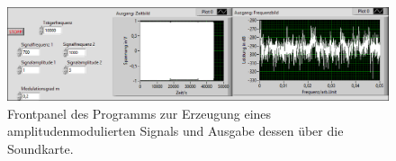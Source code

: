 \documentclass[
a4paper,
12pt,
pagesize,
ngerman
]{scrartcl}
\begin{document}
	\begin{figure}[H]  
		\includegraphics[width=1\textwidth]{EIRE2018Dateien/Tag3/Soundkarteoutoszi/AMp}
		\centering
		\caption{
			Frontpanel des Programms zur Erzeugung eines amplitudenmodulierten Signals und Ausgabe dessen über die Soundkarte.
		}
		\label{fig_tag3_am_soundkarte_front}
		\centering
	\end{figure}

	
\iffalse %
\end{document}
